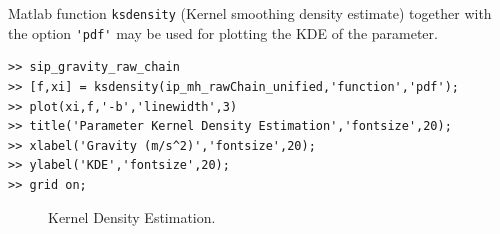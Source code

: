 Matlab function \verb+ksdensity+ (Kernel smoothing density estimate) together with the option \verb+'pdf'+ may be used for plotting the KDE of the parameter.
\begin{lstlisting}[label=matlab:kde,caption={Matlab code for the KDE plot.}]
% inside Matlab
>> sip_gravity_raw_chain
>> [f,xi] = ksdensity(ip_mh_rawChain_unified,'function','pdf');
>> plot(xi,f,'-b','linewidth',3)
>> title('Parameter Kernel Density Estimation','fontsize',20);
>> xlabel('Gravity (m/s^2)','fontsize',20);
>> ylabel('KDE','fontsize',20);
>> grid on;
\end{lstlisting}

\begin{figure}[htpb]
\centering 
{}
\vspace*{-10pt}
\caption{Kernel Density Estimation. }
\end{figure}


